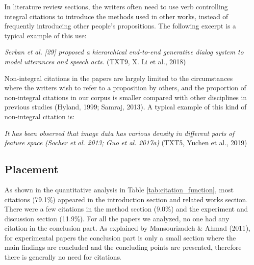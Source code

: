 In literature review sections, the writers often need to use verb controlling integral citations to introduce the methods used in other works, instead of frequently introducing other people’s propositions. The following excerpt is a typical example of this use:

\textit{Serban et al. [29] proposed a hierarchical end-to-end generative dialog system to model utterances and speech acts.} (TXT9, X. Li et al., 2018)

Non-integral citations in the papers are largely limited to the circumstances where the writers wish to refer to a proposition by others, and the proportion of non-integral citations in our corpus is smaller compared with other disciplines in previous studies (Hyland, 1999; Samraj, 2013). A typical example of this kind of non-integral citation is:

\textit{It has been observed that image data has various density in different parts of feature space (Socher et al. 2013; Guo et al. 2017a)} (TXT5, Yuchen et al., 2019)

\subsection{Placement}
As shown in the quantitative analysis in Table \ref{tab:citation_function}, most citations (79.1\%) appeared in the introduction section and related works section. There were a few citations in the method section (9.0\%) and the experiment and discussion section (11.9\%). For all the papers we analyzed, no one had any citation in the conclusion part. As explained by Mansourizadeh \& Ahmad (2011), for experimental papers the conclusion part is only a small section where the main findings are concluded and the concluding points are presented, therefore there is generally no need for citations.

